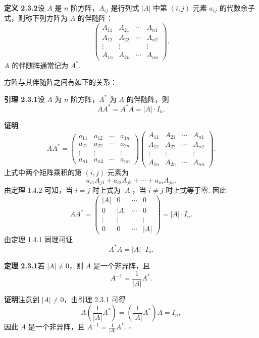 \documentclass[UTF8, 12pt, fontset=fandol, oneside]{ctexart}
\begin{document}
\noindent\textbf{定义 2.3.2}\quad 设 $A$ 是 $n$ 阶方阵，$A_{ij}$ 是行列式 $|A|$ 中第 $(i,j)$ 元素 $a_{ij}$ 的代数余子式，则称下列方阵为 $A$ 的伴随阵：
\[
\left(\begin{array}{cccc}
A_{11} & A_{21} & \cdots & A_{n1}\\
A_{12} & A_{22} & \cdots & A_{n2}\\
\vdots & \vdots & & \vdots\\
A_{1n} & A_{2n} & \cdots & A_{nn}
\end{array}\right).
\]
$A$ 的伴随阵通常记为 $A^*$.

方阵与其伴随阵之间有如下的关系：

\noindent\textbf{引理 2.3.1}\quad 设 $A$ 为 $n$ 阶方阵，$A^*$ 为 $A$ 的伴随阵，则
\[
AA^*=A^*A=|A|\cdot I_n.
\]

\noindent\textbf{证明}\quad
\[
AA^*=
\left(\begin{array}{cccc}
a_{11} & a_{12} & \cdots & a_{1n}\\
a_{21} & a_{22} & \cdots & a_{2n}\\
\vdots & \vdots & & \vdots\\
a_{n1} & a_{n2} & \cdots & a_{nn}
\end{array}\right)
\left(\begin{array}{cccc}
A_{11} & A_{21} & \cdots & A_{n1}\\
A_{12} & A_{22} & \cdots & A_{n2}\\
\vdots & \vdots & & \vdots\\
A_{1n} & A_{2n} & \cdots & A_{nn}
\end{array}\right).
\]
上式中两个矩阵乘积的第 $(i,j)$ 元素为
\[
a_{i1}A_{j1}+a_{i2}A_{j2}+\cdots+a_{in}A_{jn}.
\]
由定理 1.4.2 可知，当 $i=j$ 时上式为 $|A|$，当 $i\ne j$ 时上式等于零. 因此
\[
AA^*=
\left(\begin{array}{cccc}
|A| & 0 & \cdots & 0\\
0 & |A| & \cdots & 0\\
\vdots & \vdots & & \vdots\\
0 & 0 & \cdots & |A|
\end{array}\right)
=|A|\cdot I_n.
\]
由定理 1.4.1 同理可证
\[
A^*A=|A|\cdot I_n.
\]

\noindent\textbf{定理 2.3.1}\quad 若 $|A|\ne 0$，则 $A$ 是一个非异阵，且
\[
A^{-1}=\frac{1}{|A|}A^*.
\]

\noindent\textbf{证明}\quad 注意到 $|A|\ne 0$，由引理 2.3.1 可得
\[
A\left(\frac{1}{|A|}A^*\right)=\left(\frac{1}{|A|}A^*\right)A=I_n,
\]
因此 $A$ 是一个非异阵，且 $A^{-1}=\frac{1}{|A|}A^*$. $\square$
\end{document}
